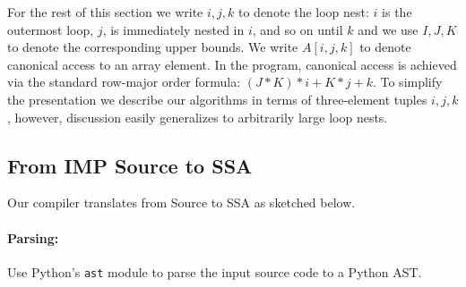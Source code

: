 For the rest of this section we write $i,j,k$ to denote the loop nest: $i$ is the outermost loop, $j$, is immediately nested in $i$, and so on until $k$
and we use $I,J,K$ to denote the corresponding upper bounds. We write $A[i,j,k]$ to denote canonical access
to an array element. In the program, canonical access is achieved via the standard row-major order formula: $(J*K)*i + K*j + k$.
To simplify the presentation we describe our algorithms in terms of three-element tuples $i,j,k$, however, discussion easily generalizes to
arbitrarily large loop nests.

\subsection{From IMP Source to SSA}
\label{sec:imp_to_ssa}

Our compiler translates from Source to SSA as sketched below. %

        \squeeze
        \paragraph{Parsing:}
        Use Python's \texttt{ast} module to parse the input source code to a Python AST.
        \squeeze
